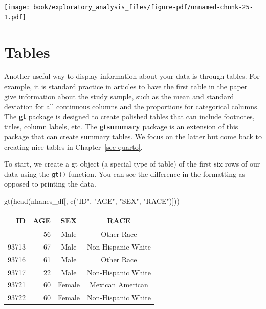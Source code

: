 \documentclass[
  letterpaper,
]{latex/krantz}
\makeatletter
\newenvironment{Shaded}{\begin{snugshade}}{\end{snugshade}}
\newcommand{\FunctionTok}[1]{\textcolor[rgb]{0.28,0.35,0.67}{#1}}
\newcommand{\NormalTok}[1]{\textcolor[rgb]{0.00,0.23,0.31}{#1}}
\newcommand{\StringTok}[1]{\textcolor[rgb]{0.13,0.47,0.30}{#1}}
\newenvironment{kframe}{%
\medskip{}
\setlength{\fboxsep}{.8em}
 \def\at@end@of@kframe{}%
 \ifinner\ifhmode%
  \def\at@end@of@kframe{\end{minipage}}%
  \begin{minipage}{\columnwidth}%
 \fi\fi%
 \def\FrameCommand##1{\hskip\@totalleftmargin \hskip-\fboxsep
 \colorbox{shadecolor}{##1}\hskip-\fboxsep
     \hskip-\linewidth \hskip-\@totalleftmargin \hskip\columnwidth}%
 \MakeFramed {\advance\hsize-\width
   \@totalleftmargin\z@ \linewidth\hsize
   \@setminipage}}%
 {\par\unskip\endMakeFramed%
 \at@end@of@kframe}
\renewenvironment{Shaded}{\begin{kframe}}{\end{kframe}}
\makeatother
\begin{document}
\begin{center}
\texttt{[image: book/exploratory\_analysis\_files/figure-pdf/unnamed-chunk-25-1.pdf]}
\end{center}

\section{\texorpdfstring{Tables }{Tables }}\label{tables}

Another useful way to display information about your data is through
tables. For example, it is standard practice in articles to have the
first table in the paper give information about the study sample, such
as the mean and standard deviation for all continuous columns and the
proportions for categorical columns. The \textbf{gt} package
 is designed to create polished tables that can
include footnotes, titles, column labels, etc. The \textbf{gtsummary}
package  is an extension of this package
that can create summary tables. We focus on the latter but come back to
creating nice tables in Chapter~\ref{sec-quarto}.

To start, we create a gt object (a special type of table) of the first
six rows of our data using the
\texttt{gt()} function. You can
see the difference in the formatting as opposed to printing the data.

\begin{Shaded}
\begin{Highlighting}[]
\FunctionTok{gt}\NormalTok{(}\FunctionTok{head}\NormalTok{(nhanes\_df[, }\FunctionTok{c}\NormalTok{(}\StringTok{"ID"}\NormalTok{, }\StringTok{"AGE"}\NormalTok{, }\StringTok{"SEX"}\NormalTok{, }\StringTok{"RACE"}\NormalTok{)])) }
\end{Highlighting}
\end{Shaded}

\begin{longtable*}{rrcc}
\toprule
ID & AGE & SEX & RACE \\ 
\midrule{} & 56 & Male & Other Race \\ 
93713 & 67 & Male & Non-Hispanic White \\ 
93716 & 61 & Male & Other Race \\ 
93717 & 22 & Male & Non-Hispanic White \\ 
93721 & 60 & Female & Mexican American \\ 
93722 & 60 & Female & Non-Hispanic White \\ 
\bottomrule
\end{longtable*}
\end{document}

